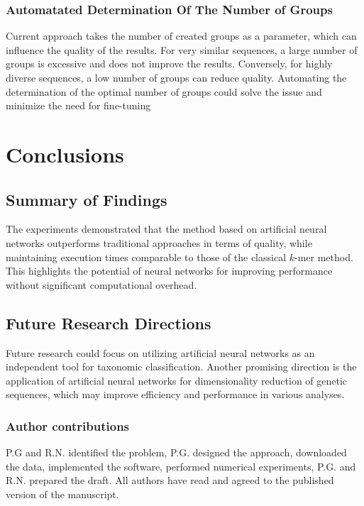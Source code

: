 \documentclass[pdflatex,sn-vancouver-num]{sn-jnl}%
\begin{document}
            \subsubsection{Automatated Determination Of The Number of Groups}
                Current approach takes the number of created groups as a parameter, which can influence the quality of the results. For very similar sequences, a large number of groups is excessive and does not improve the results. Conversely, for highly diverse sequences, a low number of groups can reduce quality. Automating the determination of the optimal number of groups could solve the issue and minimize the need for fine-tuning 

    \section{Conclusions}
        \subsection{Summary of Findings}
            The experiments demonstrated that the method based on artificial neural networks outperforms traditional approaches in terms of quality, while maintaining execution times comparable to those of the classical $k$-mer method. This highlights the potential of neural networks for improving performance without significant computational overhead.

        \subsection{Future Research Directions}
        Future research could focus on utilizing artificial neural networks as an independent tool for taxonomic classification. Another promising direction is the application of artificial neural networks for dimensionality reduction of genetic sequences, which may improve efficiency and performance in various analyses.


\subsubsection*{Author contributions}

P.G and R.N. identified the problem, P.G. designed the approach, downloaded the data, implemented the software, performed numerical experiments, P.G. and R.N. prepared the draft. All authors have read and agreed to the published version of the manuscript.
\end{document}
